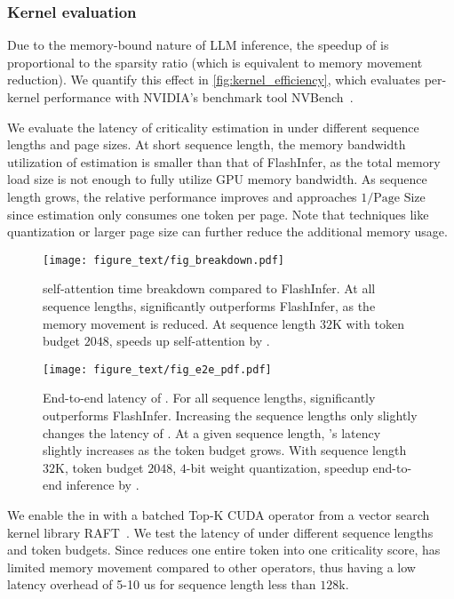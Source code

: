\subsubsection{Kernel evaluation}
\label{sec:eval:kernel}
Due to the memory-bound nature of LLM inference, the speedup of \method{} is proportional to the sparsity ratio (which is equivalent to memory movement reduction). We quantify this effect in \fig\ref{fig:kernel_efficiency}, which evaluates per-kernel performance with NVIDIA's benchmark tool NVBench~\cite{nvidia_nvbench}.

\textbf{\estimate{}}
We evaluate the latency of criticality estimation in \method{} under different sequence lengths and page sizes. At short sequence length, the memory bandwidth utilization of estimation is smaller than that of FlashInfer, as the total memory load size is not enough to fully utilize GPU memory bandwidth. As sequence length grows, the relative performance improves and approaches $1/\text{Page Size}$ since estimation only consumes one token per page. Note that techniques like quantization or larger page size can further reduce the additional memory usage.

\begin{figure*} [t]
    \centering
     \texttt{[image: figure\_text/fig\_breakdown.pdf]}
    \caption{\method self-attention time breakdown compared to FlashInfer. At all sequence lengths, \method significantly outperforms FlashInfer, as the memory movement is reduced. At sequence length $32$K with token budget $2048$, \method speeds up self-attention by \selfspeedup.}
    \label{fig:effibreak}
\end{figure*}
\begin{figure*}
    \centering
     \texttt{[image: figure\_text/fig\_e2e\_pdf.pdf]}
    \caption{End-to-end latency of \method. For all sequence lengths, \method significantly outperforms FlashInfer. Increasing the sequence lengths only slightly changes the latency of \method. At a given sequence length, \method's latency slightly increases as the token budget grows. With sequence length $32$K, token budget $2048$, $4$-bit weight quantization, \method speedup end-to-end inference by \eespeedup. }
    \label{fig:e2e}
\end{figure*}

    

\textbf{\topk{}}
We enable the \topk{} in \method{} with a batched Top-K CUDA operator from a vector search kernel library RAFT~\cite{topk2023}. We test the latency of \topk{} under different sequence lengths and token budgets. Since \estimate{} reduces one entire token into one criticality score, \topk{} has limited memory movement compared to other operators, thus having a low latency overhead of 5-10 us for sequence length less than $128$k.

